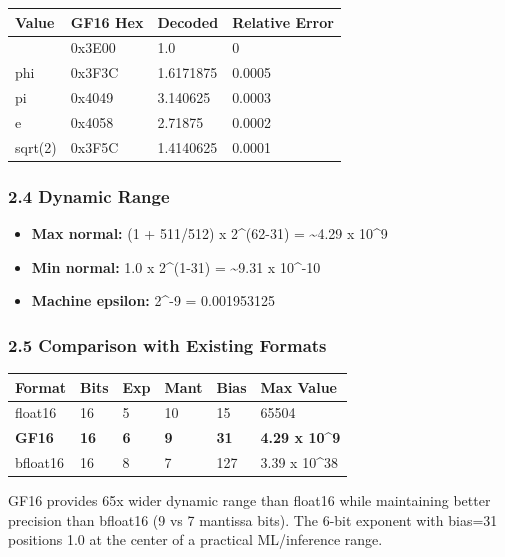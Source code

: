 \documentclass[
]{article}
\newcounter{none} %
\providecommand{\tightlist}{%
  \setlength{\itemsep}{0pt}\setlength{\parskip}{0pt}}
\begin{document}
{\def\LTcaptype{none} %
\begin{longtable}[]{@{}llll@{}}
\toprule\noalign{}
Value & GF16 Hex & Decoded & Relative Error \\
\midrule\noalign{}
\endhead
\bottomrule\noalign{}
\endlastfoot
1.0 & 0x3E00 & 1.0 & 0 \\
phi & 0x3F3C & 1.6171875 & 0.0005 \\
pi & 0x4049 & 3.140625 & 0.0003 \\
e & 0x4058 & 2.71875 & 0.0002 \\
sqrt(2) & 0x3F5C & 1.4140625 & 0.0001 \\
\end{longtable}
}

\subsubsection{2.4 Dynamic Range}\label{dynamic-range}

\begin{itemize}
\tightlist
\item
  \textbf{Max normal:} (1 + 511/512) x 2\^{}(62-31) =
  \textasciitilde4.29 x 10\^{}9
\item
  \textbf{Min normal:} 1.0 x 2\^{}(1-31) = \textasciitilde9.31 x
  10\^{}-10
\item
  \textbf{Machine epsilon:} 2\^{}-9 = 0.001953125
\end{itemize}

\subsubsection{2.5 Comparison with Existing
Formats}\label{comparison-with-existing-formats}

{\def\LTcaptype{none} %
\begin{longtable}[]{@{}llllll@{}}
\toprule\noalign{}
Format & Bits & Exp & Mant & Bias & Max Value \\
\midrule\noalign{}
\endhead
\bottomrule\noalign{}
\endlastfoot
float16 & 16 & 5 & 10 & 15 & 65504 \\
\textbf{GF16} & \textbf{16} & \textbf{6} & \textbf{9} & \textbf{31} &
\textbf{4.29 x 10\^{}9} \\
bfloat16 & 16 & 8 & 7 & 127 & 3.39 x 10\^{}38 \\
\end{longtable}
}

GF16 provides 65x wider dynamic range than float16 while maintaining
better precision than bfloat16 (9 vs 7 mantissa bits). The 6-bit
exponent with bias=31 positions 1.0 at the center of a practical
ML/inference range.
\end{document}
